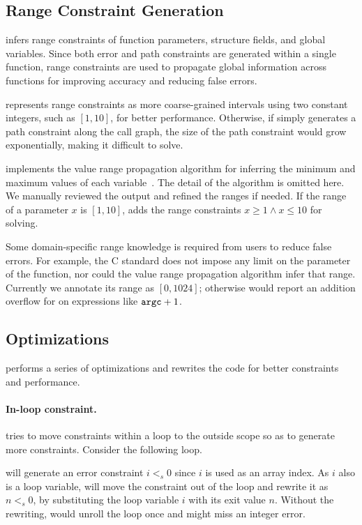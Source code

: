 \subsection{Range Constraint Generation}
\label{s:gen:range}

\sys infers range constraints of function parameters, structure
fields, and global variables.  Since both error and path constraints
are generated within a single function, range constraints are used
to propagate global information across functions for improving
accuracy and reducing false errors.

\sys represents range constraints as more coarse-grained intervals
using two constant integers, such as $[1, 10]$, for better performance.
Otherwise, if \sys simply generates a path constraint along the
call graph, the size of the path constraint would grow exponentially,
making it difficult to solve.

\sys implements the value range propagation algorithm for inferring
the minimum and maximum values of each variable~\cite{patterson:vrp}.
The detail of the algorithm is omitted here.  We manually reviewed
the output and refined the ranges if needed.  If the range of a
parameter $x$ is $[1, 10]$, \sys adds the range constraints $x \geq
1 \land x \leq 10$ for solving.

Some domain-specific range knowledge is required from users to
reduce false errors.  For example, the C standard does not impose
any limit on the  parameter of the  function, nor
could the value range propagation algorithm infer that range.
Currently we annotate its range as $[0, 1024]$; otherwise \sys would
report an addition overflow for on expressions like $\texttt{argc} + 1$.



\subsection{Optimizations}
\label{s:gen:opt}

\sys performs a series of optimizations and rewrites the code for
better constraints and performance.

\paragraph{In-loop constraint.}
\sys tries to move constraints within a loop to the outside scope
so as to generate more constraints.  Consider the following loop.

\sys will generate an error constraint $i <_s 0$ since $i$ is used
as an array index.  As $i$ also is a loop variable, \sys will move
the constraint out of the loop and rewrite it as $n <_s 0$, by
substituting the loop variable $i$ with its exit value $n$.
%
Without the rewriting, \sys would unroll the loop once and might
miss an integer error.

